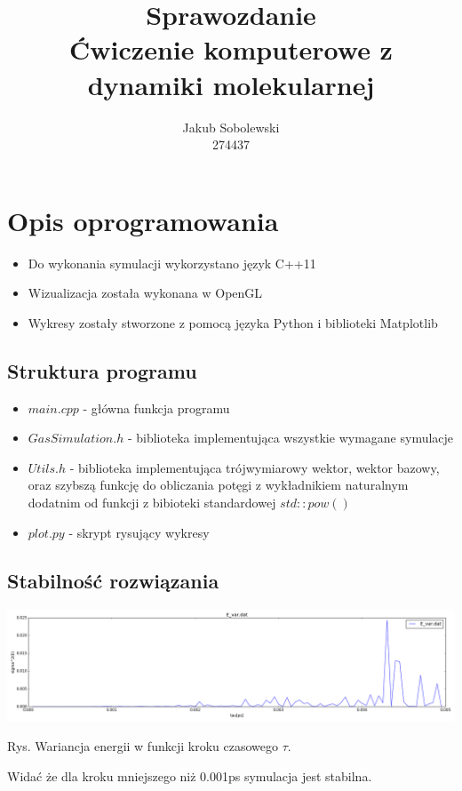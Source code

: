 \documentclass[polish,polish,a4paper,11pt]{article}
\title{Sprawozdanie \\Ćwiczenie komputerowe z dynamiki molekularnej}
\author{Jakub Sobolewski \\ 274437}
\begin{document}
\maketitle

\section{Opis oprogramowania}
\begin{itemize}
\item Do wykonania symulacji wykorzystano język C++11
\item Wizualizacja została wykonana w OpenGL
\item Wykresy zostały stworzone z pomocą języka Python i biblioteki Matplotlib
\end{itemize}
\subsection{Struktura programu}
\begin{itemize}
\item $main.cpp$ - główna funkcja programu
\item $GasSimulation.h$ - biblioteka implementująca wszystkie wymagane symulacje
\item $Utils.h$ - biblioteka implementująca trójwymiarowy wektor, wektor bazowy, oraz szybszą funkcję do obliczania potęgi z wykładnikiem naturalnym dodatnim od funkcji z bibioteki standardowej $std::pow()$
\item $plot.py$ - skrypt rysujący wykresy
\end{itemize}

\subsection{Stabilność rozwiązania}
\begin{center}
\includegraphics[scale=0.3]{../Data/E_var.png}
\end{center}
\begin{center}
Rys.  Wariancja energii w funkcji kroku czasowego $\tau$.
\end{center}
Widać że dla kroku mniejszego niż 0.001ps symulacja jest stabilna.
 
\end{document}

